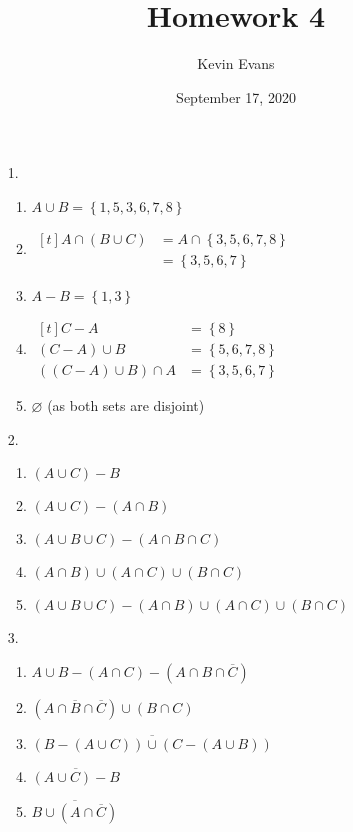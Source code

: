 \documentclass{homework}
\title{Homework 4}
\author{Kevin Evans}
\date{September 17, 2020}
\begin{document}
	\maketitle
	\begin{enumerate}
		\item[1.] \begin{enumerate}
			\item $A \cup B = \left\{ 1, 5, 3, 6, 7, 8 \right\}$
			\item $\begin{aligned}[t]
				A \cap \left(B \cup C\right) & = A \cap \left\{ 3, 5, 6, 7, 8\right\} \\
				& = \left\{ 3, 5, 6, 7\right\}
			\end{aligned}$
			\item $A - B = \left\{1, 3 \right\}$
			\item $\begin{aligned}[t]
				C - A & = \left\{ 8 \right\} \\
				\left(C - A\right) \cup B & = \left\{ 5, 6, 7, 8\right\} \\
				\left(\left(C - A\right) \cup B\right) \cap A& = \left\{ 3, 5, 6, 7 \right\}
			\end{aligned}$
			
			\item $\varnothing$ (as both sets are disjoint)
		\end{enumerate}
	
	
		\item[2.] \begin{enumerate}
			\item $\left(A \cup C\right) - B$
			\item $\left(A \cup C\right) - \left(A \cap B\right)$
			\item $\left(A \cup B \cup C\right) - \left(A \cap B \cap C\right)$
			\item $\left(A \cap B\right) \cup \left(A \cap C\right) \cup \left(B \cap C\right)$
			\item $\left(A \cup B \cup C\right) - \left(A \cap B\right) \cup \left(A \cap C\right) \cup \left(B \cap C\right)$
		\end{enumerate}
	
		\item[3.] \begin{enumerate}
			\item $A \cup B - \left(A \cap C\right) - \left(A \cap B \cap \overline{C}\right)$
			\item $\left(A \cap \overline{B} \cap \overline{C}\right)\cup \left(B \cap C\right)$
			\item $\overline{\left(B - \left(A \cup C\right)\right) \cup \left(C - \left(A \cup B\right)\right)}$
			\item $\overline{ \left(A \cup C\right) - B }$
			\item $\overline{B \cup \left(A \cap \overline{C}\right)}$
		\end{enumerate}
	

\end{enumerate}
\end{document}
